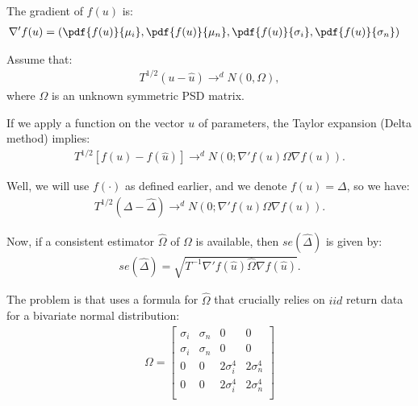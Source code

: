 \documentclass[12pt,oneside,a4paper]{article}
\begin{document}
The gradient of $f(u)$ is:
\begin{align*}
\nabla' f(u) &=
\left( 
\pdf{f(u)}{\mu_{i}},
\pdf{f(u)}{\mu_{n}},
\pdf{f(u)}{\sigma_{i}},
\pdf{f(u)}{\sigma_{n}}
\right)
\end{align*}

% 
Assume that:
\begin{align*}
	T^{1/2}(u - \hat{u}) \to^d N(0, \Omega),
\end{align*}
where $\Omega$ is an unknown symmetric PSD matrix.

If we apply a function on the vector $u$ of parameters, the Taylor expansion (Delta method) implies:
\begin{align*}
T^{1/2}[f(u) - f(\hat{u})] \to^d N \left( 0; \nabla'f(u) \Omega \nabla f(u)  \right).
\end{align*}

Well, we will use $f(\cdot)$ as defined earlier, and we denote $f(u) = \Delta$, so we have:
\begin{align*}
T^{1/2}(\Delta - \hat{\Delta}) 	\to^d N \left( 0; \nabla'f(u) \Omega \nabla f(u)  \right).
\end{align*}

Now, if a consistent estimator $\hat{\Omega}$ of $\Omega$ is available, then $se(\hat{\Delta})$ is given by:
\begin{align}
se(\hat{\Delta}) = \sqrt{T^{-1} \nabla'f(\hat{u}) \hat{\Omega} \nabla f(\hat{u})}.
\end{align}

The problem is that \cite{jb81-sr} uses a formula for $\hat{\Omega}$ that crucially relies on $iid$ return data for a bivariate normal distribution:
\begin{align*}
\Omega = 
\begin{bmatrix}
\sigma_{i} & \sigma_{n} & 0 & 0 \\
\sigma_{i} & \sigma_{n} & 0 & 0 \\
0 & 0 & 2\sigma^{4}_{i} & 2\sigma^{4}_{n}  \\
0 & 0 & 2\sigma^{4}_{i} & 2\sigma^{4}_{n}  \\
\end{bmatrix}
\end{align*}
\end{document}
